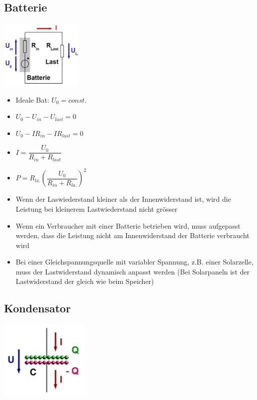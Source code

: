 \documentclass[8pt,a4paper]{scrartcl}
\begin{document}
\begin{multicols*}{3}
		\subsection{Batterie}
			\begin{multicols*}{2}
				\includegraphics[height=3.3cm]{img/batterie.png} \\
				\begin{itemize}\itemsep0pt
					\item Ideale Bat: $U_{0}=const.$				
					\item $U_{0}-U_{in}-U_{last} =0$
					\item $U_{0}-IR_{in}-IR_{last} =0$
					\item $I=\dfrac{U_{0}}{R_{in}+R_{last}}$
					\item $P=R_{la.}(\dfrac{U_{0}}{R_{in}+R_{la.}})^{2}$
				\end{itemize}
			\end{multicols*}
			\begin{itemize}\itemsep0pt
				\item Wenn der Laswiederstand kleiner als der Innenwiderstand ist, wird die Leistung bei kleinerem Lastwiederstand nicht grösser
				\item Wenn ein Verbraucher mit einer Batterie betrieben wird, muss aufgepasst werden, dass die Leistung nicht am Innenwiderstand der Batterie verbraucht wird
				\item Bei einer Gleichspannungsquelle mit variabler Spannung, z.B. einer Solarzelle, muss der Lastwiderstand dynamisch anpasst werden (Bei Solarpaneln ist der Lastwiderstand der gleich wie beim Speicher)	
				
			\end{itemize}
			
		\subsection{Kondensator}
			\begin{multicols*}{2}
				\includegraphics[height=3.8cm]{img/kondensator1.png} 
				

\end{multicols*}
\end{multicols*}
\end{document}
